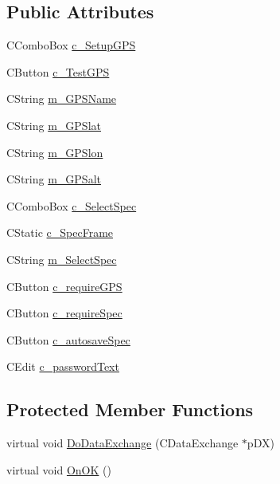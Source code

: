 \subsection*{Public Attributes}
\begin{DoxyCompactItemize}
\item 
CComboBox \hyperlink{classCSetupDialog_a1a0f9e4bec0c20637f2589da2c1d804c}{c\_\-SetupGPS}
\item 
CButton \hyperlink{classCSetupDialog_acefe06eb4c212a09f9c0a6b615b0d35f}{c\_\-TestGPS}
\item 
CString \hyperlink{classCSetupDialog_aad1a3ae46513e4df1199e6ff13715a6f}{m\_\-GPSName}
\item 
CString \hyperlink{classCSetupDialog_ad5fbe9645170fc5bf172f338aa4c029e}{m\_\-GPSlat}
\item 
CString \hyperlink{classCSetupDialog_aeaf91b37cc812e8de9330f2ba12d27b3}{m\_\-GPSlon}
\item 
CString \hyperlink{classCSetupDialog_a8750ab7d5683e14d0e7802a3177aedc6}{m\_\-GPSalt}
\item 
CComboBox \hyperlink{classCSetupDialog_a0a66e6d51d04b9a568b2c78d10161b30}{c\_\-SelectSpec}
\item 
CStatic \hyperlink{classCSetupDialog_a06485b5a59838ea8d4c4751ad294b151}{c\_\-SpecFrame}
\item 
CString \hyperlink{classCSetupDialog_ab857444d15fb333c2a7232e3b9ee799d}{m\_\-SelectSpec}
\item 
CButton \hyperlink{classCSetupDialog_afdf50f7162cb151b4c2841f4fc9cb8c8}{c\_\-requireGPS}
\item 
CButton \hyperlink{classCSetupDialog_ab7c5adbfcb68c03fe442d16512b3576a}{c\_\-requireSpec}
\item 
CButton \hyperlink{classCSetupDialog_a789c028127b67f50c7cf7cd244128fd4}{c\_\-autosaveSpec}
\item 
CEdit \hyperlink{classCSetupDialog_aba904d5349c9a004c61bdf91418615dc}{c\_\-passwordText}
\end{DoxyCompactItemize}
\subsection*{Protected Member Functions}
\begin{DoxyCompactItemize}
\item 
virtual void \hyperlink{classCSetupDialog_ad7ed1e55cc89c2cf54da5ddf7dbb7f6d}{DoDataExchange} (CDataExchange $\ast$pDX)
\item 
virtual void \hyperlink{classCSetupDialog_a59285fb2ba6be17a7fc61cc9aa08e9f4}{OnOK} ()
\end{DoxyCompactItemize}
